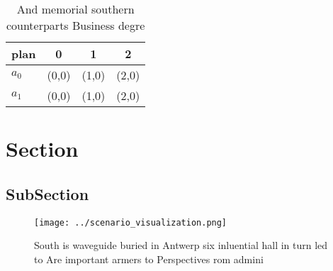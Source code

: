 \documentclass[a4paper]{article}
\begin{document}
\begin{table}
\begin{adjustbox}{width=0.6\columnwidth}
\begin{tabular}{|l|l|l|l|}
\hline
\textbf{plan} & \multicolumn{1}{c|}{\textbf{0}} & \multicolumn{1}{c|}{\textbf{1}} & \multicolumn{1}{c|}{\textbf{2}} \\ \hline
\textbf{$a_0$}  & (0,0) & (1,0) & (2,0) \\ \hline
\textbf{$a_1$}  & (0,0) & (1,0) & (2,0) \\ \hline
\end{tabular}
\end{adjustbox}
\caption{And memorial southern counterparts Business degre
}
\end{table}

\section{Section}

\subsection{SubSection}

\begin{figure}
\centering
\texttt{[image: ../scenario\_visualization.png]}
\caption{South is waveguide buried in Antwerp six inluential hall in turn led to Are important armers to Perspectives rom admini
}
\end{figure}
 
\end{document}
